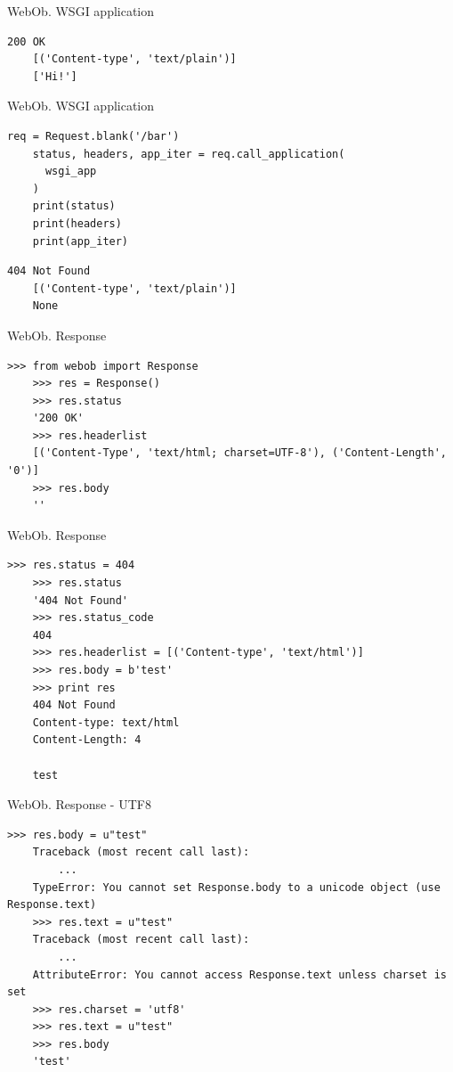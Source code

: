 \begin{frame}[fragile]{WebOb. WSGI application}

  \begin{lstlisting}[style=python]
    200 OK
    [('Content-type', 'text/plain')]
    ['Hi!']
  \end{lstlisting}

\end{frame}

\begin{frame}[fragile]{WebOb. WSGI application}

  \begin{lstlisting}[style=python]
    req = Request.blank('/bar')
    status, headers, app_iter = req.call_application(
      wsgi_app
    )
    print(status)
    print(headers)
    print(app_iter)
  \end{lstlisting}

  \begin{lstlisting}[style=python]
    404 Not Found
    [('Content-type', 'text/plain')]
    None
  \end{lstlisting}

\end{frame}

\begin{frame}[fragile]{WebOb. Response}

  \begin{lstlisting}[style=python]
    >>> from webob import Response
    >>> res = Response()
    >>> res.status
    '200 OK'
    >>> res.headerlist
    [('Content-Type', 'text/html; charset=UTF-8'), ('Content-Length', '0')]
    >>> res.body
    ''
  \end{lstlisting}

\end{frame}


\begin{frame}[fragile]{WebOb. Response}

  \begin{lstlisting}[style=python]
    >>> res.status = 404
    >>> res.status
    '404 Not Found'
    >>> res.status_code
    404
    >>> res.headerlist = [('Content-type', 'text/html')]
    >>> res.body = b'test'
    >>> print res
    404 Not Found
    Content-type: text/html
    Content-Length: 4

    test
  \end{lstlisting}

\end{frame}

\begin{frame}[fragile]{WebOb. Response - UTF8}

  \begin{lstlisting}[style=python]
    >>> res.body = u"test"
    Traceback (most recent call last):
        ...
    TypeError: You cannot set Response.body to a unicode object (use Response.text)
    >>> res.text = u"test"
    Traceback (most recent call last):
        ...
    AttributeError: You cannot access Response.text unless charset is set
    >>> res.charset = 'utf8'
    >>> res.text = u"test"
    >>> res.body
    'test'
  \end{lstlisting}

\end{frame}

